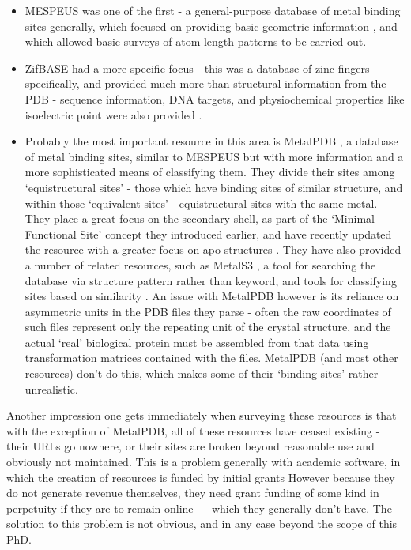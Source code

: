 \begin{itemize}

\item MESPEUS was one of the first - a general-purpose database of metal binding sites generally, which focused on providing basic geometric information \cite{hsin2008mespeus}, and which allowed basic surveys of atom-length patterns to be carried out.

\item ZifBASE had a more specific focus - this was a database of zinc fingers specifically, and provided much more than structural information from the PDB - sequence information, DNA targets, and physiochemical properties like isoelectric point were also provided \cite{jayakanthan2009zifbase}.

\item Probably the most important resource in this area is MetalPDB \cite{andreini2012metalpdb}, a database of metal binding sites, similar to MESPEUS but with more information and a more sophisticated means of classifying them. They divide their sites among `equistructural sites' - those which have binding sites of similar structure, and within those `equivalent sites' - equistructural sites with the same metal. They place a great focus on the secondary shell, as part of the `Minimal Functional Site' concept they introduced earlier, and have recently updated the resource with a greater focus on apo-structures \cite{putignano2017metalpdb}. They have also provided a number of related resources, such as MetalS3 \cite{valasatava2014metals}, a tool for searching the database via structure pattern rather than keyword, and tools for classifying sites based on similarity \cite{sobolev2013web}. An issue with MetalPDB however is its reliance on asymmetric units in the PDB files they parse - often the raw coordinates of such files represent only the repeating unit of the crystal structure, and the actual `real' biological protein must be assembled from that data using transformation matrices contained with the files. MetalPDB (and most other resources) don't do this, which makes some of their `binding sites' rather unrealistic.

\end{itemize}

Another impression one gets immediately when surveying these resources is that with the exception of MetalPDB, all of these resources have ceased existing - their URLs go nowhere, or their sites are broken beyond reasonable use and obviously not maintained. This is a problem generally with academic software, in which the creation of resources is funded by initial grants However because they do not generate revenue themselves, they need grant funding of some kind in perpetuity if they are to remain online --- which they generally don't have. The solution to this problem is not obvious, and in any case beyond the scope of this PhD.

